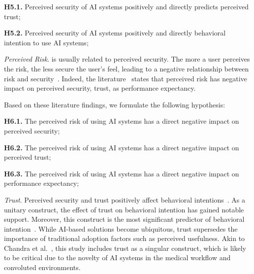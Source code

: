 \noindent
{\bf H5.1.} Perceived security of AI systems positively and directly predicts perceived trust;

\vspace{2.25mm}

\noindent
{\bf H5.2.} Perceived security of AI systems positively and directly behavioral intention to use AI systems;

\vspace{2.25mm}

{\it Perceived Risk}. is usually related to perceived security.
The more a user perceives the risk, the less secure the user's feel, leading to a negative relationship between risk and security~\cite{KHALILZADEH2017460}.
Indeed, the literature~\cite{SHIN20091343, Thakur2014} states that perceived risk has negative impact on perceived security, trust, as performance expectancy.

\vspace{2.25mm}

\noindent
Based on these literature findings, we formulate the following hypothesis:

\vspace{2.25mm}

\noindent
{\bf H6.1.} The perceived risk of using AI systems has a direct negative impact on perceived security;

\vspace{2.25mm}

\noindent
{\bf H6.2.} The perceived risk of using AI systems has a direct negative impact on perceived trust;

\vspace{2.25mm}

\noindent
{\bf H6.3.} The perceived risk of using AI systems has a direct negative impact on performance expectancy;

\vspace{2.25mm}

{\it Trust}. Perceived security and trust positively affect behavioral intentions~\cite{SHIN20091343}.
As a unitary construct, the effect of trust on behavioral intention has gained notable support.
Moreover, this construct is the most significant predictor of behavioral intention~\cite{chandra2010evaluating, SHIN20091343}.
While AI-based solutions become ubiquitous, trust supersedes the importance of traditional adoption factors such as perceived usefulness.
Akin to Chandra et al.~\cite{chandra2010evaluating}, this study includes trust as a singular construct, which is likely to be critical due to the novelty of AI systems in the medical workflow and convoluted environments.

